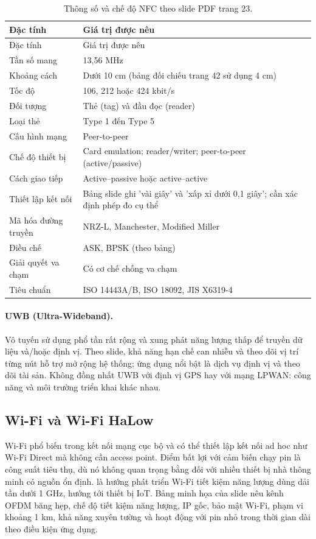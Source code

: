 \begin{longtable}{p{}p{}}
\caption{Thông số và chế độ NFC theo slide PDF trang 23.}\\\toprule
Đặc tính & Giá trị được nêu\\\midrule\endfirsthead
\toprule Đặc tính & Giá trị được nêu\\\midrule\endhead
Tần số mang & 13,56 MHz\\
Khoảng cách & Dưới 10 cm (bảng đối chiếu trang 42 sử dụng 4 cm)\\
Tốc độ & 106, 212 hoặc 424 kbit/s\\
Đối tượng & Thẻ (tag) và đầu đọc (reader)\\
Loại thẻ & Type 1 đến Type 5\\
Cấu hình mạng & Peer-to-peer\\
Chế độ thiết bị & Card emulation; reader/writer; peer-to-peer (active/passive)\\
Cách giao tiếp & Active--passive hoặc active--active\\
Thiết lập kết nối & Bảng slide ghi 'vài giây' và 'xấp xỉ dưới 0,1 giây'; cần xác định phép đo cụ thể\\
Mã hóa đường truyền & NRZ-L, Manchester, Modified Miller\\
Điều chế & ASK, BPSK (theo bảng)\\
Giải quyết va chạm & Có cơ chế chống va chạm\\
Tiêu chuẩn & ISO 14443A/B, ISO 18092, JIS X6319-4\\\bottomrule
\end{longtable}

\paragraph{UWB (Ultra-Wideband).} Vô tuyến sử dụng phổ tần rất rộng và xung phát năng lượng thấp để truyền dữ liệu và/hoặc định vị. Theo slide, khả năng hạn chế can nhiễu và theo dõi vị trí từng nút hỗ trợ mở rộng hệ thống; ứng dụng nổi bật là dịch vụ định vị và theo dõi tài sản. Không đồng nhất UWB với định vị GPS hay với mạng LPWAN: công năng và môi trường triển khai khác nhau. 

\subsection{Wi-Fi và Wi-Fi HaLow}
Wi-Fi phổ biến trong kết nối mạng cục bộ và có thể thiết lập kết nối ad hoc như Wi-Fi Direct mà không cần access point. Điểm bất lợi với cảm biến chạy pin là công suất tiêu thụ, dù nó không quan trọng bằng đối với nhiều thiết bị nhà thông minh có nguồn ổn định.  là hướng phát triển Wi-Fi tiết kiệm năng lượng dùng dải tần dưới 1 GHz, hướng tới thiết bị IoT. Bảng minh họa của slide nêu kênh OFDM băng hẹp, chế độ tiết kiệm năng lượng, IP gốc, bảo mật Wi-Fi, phạm vi khoảng 1 km, khả năng xuyên tường và hoạt động với pin nhỏ trong thời gian dài theo điều kiện ứng dụng. 

